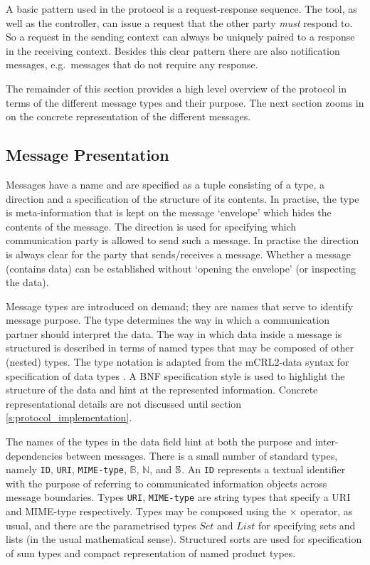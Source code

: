\documentclass{article}
\newcommand{\String}{\ensuremath \mathbb{S}\xspace}
\newcommand{\Id}{\texttt{ID}\xspace}
\newcommand{\URI}{\texttt{URI}\xspace}
\newcommand{\MIMEtype}{\texttt{MIME-type}\xspace}
\begin{document}
  A basic pattern used in the protocol is a request-response sequence. The
  tool, as well as the controller, can issue a request that the other party
  \emph{must} respond to. So a request in the sending context can always be
  uniquely paired to a response in the receiving context. Besides this clear
  pattern there are also notification messages, e.g.\ messages that do not
  require any response.

  The remainder of this section provides a high level overview of the protocol
  in terms of the different message types and their purpose. The next section
  zooms in on the concrete representation of the different messages.

  \subsection{Message Presentation}

   Messages have a name and are specified as a tuple consisting of a type, a
   direction and a specification of the structure of its contents. In practise,
   the type is meta-information that is kept on the message `envelope' which
   hides the contents of the message. The direction is used for specifying
   which communication party is allowed to send such a message. In practise the
   direction is always clear for the party that sends/receives a message.
   Whether a message (contains data) can be established without `opening the
   envelope' (or inspecting the data).

   Message types are introduced on demand; they are names that serve to
   identify message purpose. The type determines the way in which a
   communication partner should interpret the data. The way in which data
   inside a message is structured is described in terms of named types that may
   be composed of other (nested) types. The type notation is adapted from the
   mCRL2-data syntax for specification of data types
   \cite{groote_et_al:DSP:2007:862}. A BNF specification style is used to
   highlight the structure of the data and hint at the represented information.
   Concrete representational details are not discussed until section
   \ref{s:protocol_implementation}.

   The names of the types in the data field hint at both the purpose and
   inter-dependencies between messages. There is a small number of standard
   types, namely \Id, \URI, \MIMEtype, $\mathbb{B}$, $\mathbb{N}$, and
   $\String$.  An \Id represents a textual identifier with the purpose of
   referring to communicated information objects across message boundaries.
   Types \URI, \MIMEtype are string types that specify a URI \cite{rfc3305} and
   MIME-type \cite{rfc2045} respectively.
   Types may be composed using the $\times$ operator, as usual, and there are
   the parametrised types $Set$ and $List$ for specifying sets and lists (in
   the usual mathematical sense). Structured sorts are used for specification
   of sum types and compact representation of named product types.
\end{document}

